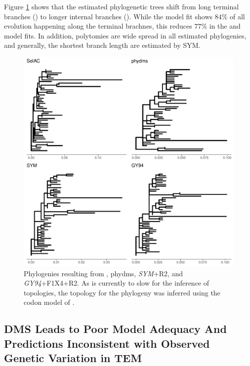 \documentclass[12pt]{article}
\begin{document}
Figure \ref{fig:phylo} shows that the estimated phylogenetic trees shift from long terminal branches (\selac) to longer internal branches (\phydms).
While the \selac model fit shows $84 \%$ of all evolution happening along the terminal brachnes, this reduces $77 \%$ in the \phydms and \gy model fits.
In addition, polytomies are wide spread in all estimated phylogenies, and generally, the shortest branch length are estimated by SYM.


\singlespacing
\begin{figure}[H]
     \centering
	\includegraphics[width=\textwidth]{img/phy_TEM2016.pdf}
	\caption{Phylogenies resulting from \selac, phydms, \emph{SYM}+R2, and \emph{GY94}+F1X4+R2. As \selac is currently to slow for the inference of topologies, the topology for the \selac phylogeny was inferred using the codon model of \citet{KosiolEtAl07}.}
	\label{fig:phylo}
\end{figure}
\doublespacing
\clearpage

\subsection{DMS Leads to Poor Model Adequacy And Predictions Inconsistent with Observed Genetic Variation in TEM}
\end{document}
